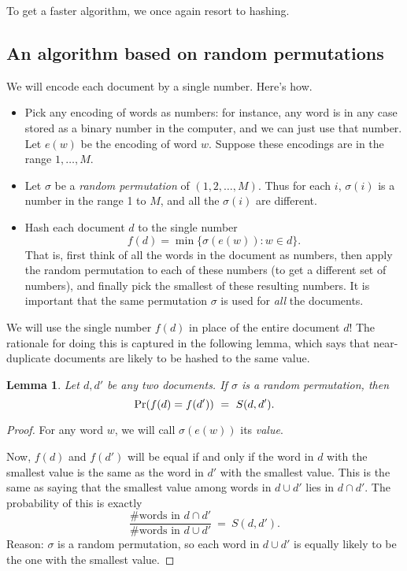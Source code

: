 \documentclass{report}
\theoremstyle{plain}
\newtheorem{lemma}{Lemma}
\theoremstyle{definition}
\newcommand{\pr}{\mbox{\rm Pr}}
\begin{document}
To get a faster algorithm, we once again resort to hashing.

\subsection{An algorithm based on random permutations}

We will encode each document by a single number. Here's how.
\begin{itemize}
\item Pick any encoding of words as numbers: for instance, any word is in any case stored
as a binary number in the computer, and we can just use that number. Let $e(w)$ be the encoding
of word $w$. Suppose these encodings are in the range $1,\ldots, M$.
\item Let $\sigma$ be a {\it random permutation} of $(1,2,\ldots, M)$. Thus for each $i$, 
$\sigma(i)$ is a number in the range 1 to $M$, and all the $\sigma(i)$ are different.
\item Hash each document $d$ to the single number
$$ f(d) = \min \{\sigma(e(w)): w \in d\} .$$
That is, first think of all the words in the document as numbers, then apply the random 
permutation to each of these numbers (to get a different set of numbers), and finally pick
the smallest of these resulting numbers. It is important that the same permutation $\sigma$
is used for {\it all} the documents.
\end{itemize}

We will use the single number $f(d)$ in place of the entire document $d$! The rationale for doing 
this is captured in the following lemma, which says that near-duplicate documents are likely to
be hashed to the same value.
\begin{lemma}
Let $d,d'$ be any two documents. If $\sigma$ is a random permutation, then
$$ \pr(f(d) = f(d')) \ = \ S(d,d') .$$
\end{lemma}
\begin{proof}
For any word $w$, we will call $\sigma(e(w))$ its {\it value}.

Now, $f(d)$ and $f(d')$ will be equal if and only if the word in $d$ with the
smallest value is the same as the word in $d'$ with the smallest value. This is the same 
as saying that the smallest value among words in $d \cup d'$ lies in $d \cap d'$. The 
probability of this is exactly
$$ \frac{\mbox{\# words in $d \cap d'$}}{\mbox{\# words in $d \cup d'$}} \ = \ S(d,d').$$
Reason: $\sigma$ is a random permutation, so each word in $d \cup d'$ is equally likely to 
be the one with the smallest value.
\end{proof}
\end{document}

